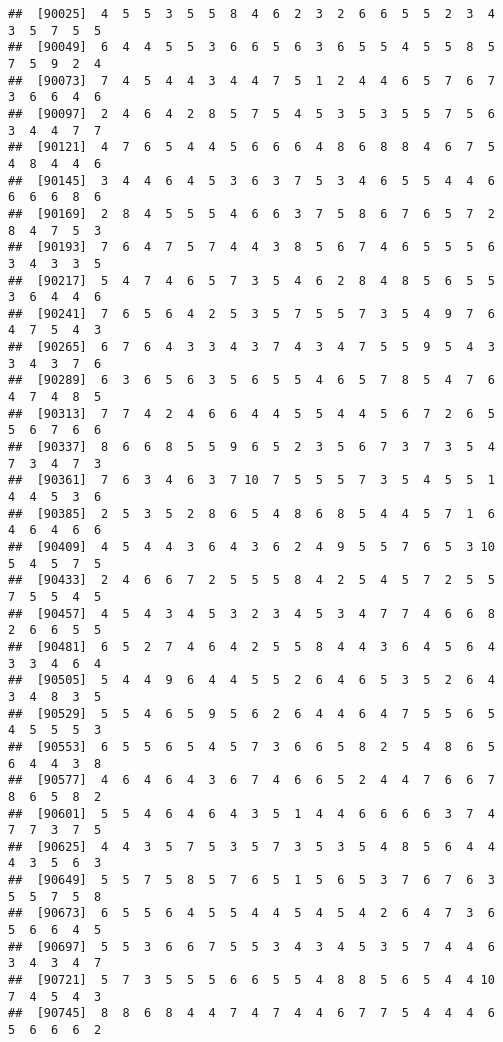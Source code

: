\documentclass[
]{book}
\begin{document}
\begin{verbatim}
##  [90025]  4  5  5  3  5  5  8  4  6  2  3  2  6  6  5  5  2  3  4  3  5  7  5  5
##  [90049]  6  4  4  5  5  3  6  6  5  6  3  6  5  5  4  5  5  8  5  7  5  9  2  4
##  [90073]  7  4  5  4  4  3  4  4  7  5  1  2  4  4  6  5  7  6  7  3  6  6  4  6
##  [90097]  2  4  6  4  2  8  5  7  5  4  5  3  5  3  5  5  7  5  6  3  4  4  7  7
##  [90121]  4  7  6  5  4  4  5  6  6  6  4  8  6  8  8  4  6  7  5  4  8  4  4  6
##  [90145]  3  4  4  6  4  5  3  6  3  7  5  3  4  6  5  5  4  4  6  6  6  6  8  6
##  [90169]  2  8  4  5  5  5  4  6  6  3  7  5  8  6  7  6  5  7  2  8  4  7  5  3
##  [90193]  7  6  4  7  5  7  4  4  3  8  5  6  7  4  6  5  5  5  6  3  4  3  3  5
##  [90217]  5  4  7  4  6  5  7  3  5  4  6  2  8  4  8  5  6  5  5  3  6  4  4  6
##  [90241]  7  6  5  6  4  2  5  3  5  7  5  5  7  3  5  4  9  7  6  4  7  5  4  3
##  [90265]  6  7  6  4  3  3  4  3  7  4  3  4  7  5  5  9  5  4  3  3  4  3  7  6
##  [90289]  6  3  6  5  6  3  5  6  5  5  4  6  5  7  8  5  4  7  6  4  7  4  8  5
##  [90313]  7  7  4  2  4  6  6  4  4  5  5  4  4  5  6  7  2  6  5  5  6  7  6  6
##  [90337]  8  6  6  8  5  5  9  6  5  2  3  5  6  7  3  7  3  5  4  7  3  4  7  3
##  [90361]  7  6  3  4  6  3  7 10  7  5  5  5  7  3  5  4  5  5  1  4  4  5  3  6
##  [90385]  2  5  3  5  2  8  6  5  4  8  6  8  5  4  4  5  7  1  6  4  6  4  6  6
##  [90409]  4  5  4  4  3  6  4  3  6  2  4  9  5  5  7  6  5  3 10  5  4  5  7  5
##  [90433]  2  4  6  6  7  2  5  5  5  8  4  2  5  4  5  7  2  5  5  7  5  5  4  5
##  [90457]  4  5  4  3  4  5  3  2  3  4  5  3  4  7  7  4  6  6  8  2  6  6  5  5
##  [90481]  6  5  2  7  4  6  4  2  5  5  8  4  4  3  6  4  5  6  4  3  3  4  6  4
##  [90505]  5  4  4  9  6  4  4  5  5  2  6  4  6  5  3  5  2  6  4  3  4  8  3  5
##  [90529]  5  5  4  6  5  9  5  6  2  6  4  4  6  4  7  5  5  6  5  4  5  5  5  3
##  [90553]  6  5  5  6  5  4  5  7  3  6  6  5  8  2  5  4  8  6  5  6  4  4  3  8
##  [90577]  4  6  4  6  4  3  6  7  4  6  6  5  2  4  4  7  6  6  7  8  6  5  8  2
##  [90601]  5  5  4  6  4  6  4  3  5  1  4  4  6  6  6  6  3  7  4  7  7  3  7  5
##  [90625]  4  4  3  5  7  5  3  5  7  3  5  3  5  4  8  5  6  4  4  4  3  5  6  3
##  [90649]  5  5  7  5  8  5  7  6  5  1  5  6  5  3  7  6  7  6  3  5  5  7  5  8
##  [90673]  6  5  5  6  4  5  5  4  4  5  4  5  4  2  6  4  7  3  6  5  6  6  4  5
##  [90697]  5  5  3  6  6  7  5  5  3  4  3  4  5  3  5  7  4  4  6  3  4  3  4  7
##  [90721]  5  7  3  5  5  5  6  6  5  5  4  8  8  5  6  5  4  4 10  7  4  5  4  3
##  [90745]  8  8  6  8  4  4  7  4  7  4  4  6  7  7  5  4  4  4  6  5  6  6  6  2

\end{verbatim}
\end{document}

